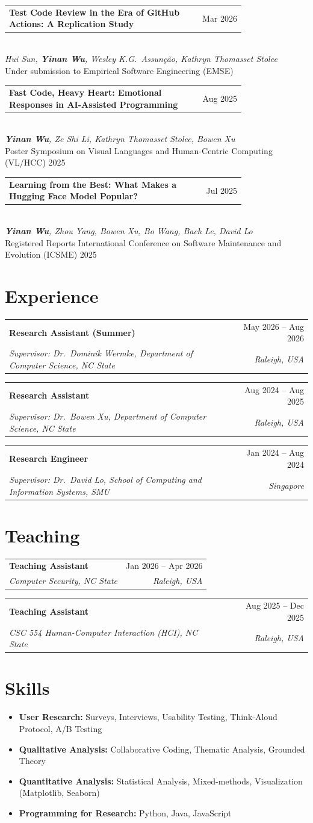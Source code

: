 \documentclass[11pt,a4paper]{article}
\makeatletter
\newcommand{\entry}[4]{%
  \noindent\begin{minipage}[t]{\linewidth}
    \begin{tabular*}{\linewidth}{@{}l@{\extracolsep{\fill}}r@{}}
      \textbf{#1} & #3 \\
      \textit{\color{muted}#2} & \textit{\color{muted}#4} \\
    \end{tabular*}
  \end{minipage}\vspace{2pt}
}
\newcommand{\pub}[4]{%
  \noindent\begin{tabular*}{\linewidth}{@{}p{0.78\linewidth}@{\extracolsep{\fill}}r@{}}
    \small\textbf{#1} & \small #4 \\
  \end{tabular*}\\
  \small\textit{#2}\\
  {\small\color{muted}#3}
  \vspace{6pt}
}
\newcommand{\me}{\textnormal{\textbf{Yinan Wu}}}
\makeatother
\begin{document}
\pub{Test Code Review in the Era of GitHub Actions: A Replication Study}%
{Hui Sun, \me, Wesley K.G.\ Assun\c{c}\~ao, Kathryn Thomasset Stolee}%
{Under submission to Empirical Software Engineering (EMSE)}%
{Mar 2026}

\pub{Fast Code, Heavy Heart: Emotional Responses in AI-Assisted Programming}%
{\me, Ze Shi Li, Kathryn Thomasset Stolee, Bowen Xu}%
{Poster \textbar{} Symposium on Visual Languages and Human-Centric Computing (VL/HCC) 2025}%
{Aug 2025}

\pub{Learning from the Best: What Makes a Hugging Face Model Popular?}%
{\me, Zhou Yang, Bowen Xu, Bo Wang, Bach Le, David Lo}%
{Registered Reports \textbar{} International Conference on Software Maintenance and Evolution (ICSME) 2025}%
{Jul 2025}

\section*{Experience}

\entry{Research Assistant (Summer)}{Supervisor: Dr.\ Dominik Wermke, Department of Computer Science, NC State}{May 2026 -- Aug 2026}{Raleigh, USA}
\vspace{4pt}

\entry{Research Assistant}{Supervisor: Dr.\ Bowen Xu, Department of Computer Science, NC State}{Aug 2024 -- Aug 2025}{Raleigh, USA}
\vspace{4pt}

\entry{Research Engineer}{Supervisor: Dr.\ David Lo, School of Computing and Information Systems, SMU}{Jan 2024 -- Aug 2024}{Singapore}

\section*{Teaching}

\entry{Teaching Assistant}{Computer Security, NC State}{Jan 2026 -- Apr 2026}{Raleigh, USA}
\vspace{4pt}

\entry{Teaching Assistant}{CSC 554 Human-Computer Interaction (HCI), NC State}{Aug 2025 -- Dec 2025}{Raleigh, USA}

\section*{Skills}
\begin{itemize}
  \item \textbf{User Research:} Surveys, Interviews, Usability Testing, Think-Aloud Protocol, A/B Testing
  \item \textbf{Qualitative Analysis:} Collaborative Coding, Thematic Analysis, Grounded Theory
  \item \textbf{Quantitative Analysis:} Statistical Analysis, Mixed-methods, Visualization (Matplotlib, Seaborn)
  \item \textbf{Programming for Research:} Python, Java, JavaScript
\end{itemize}
\end{document}
